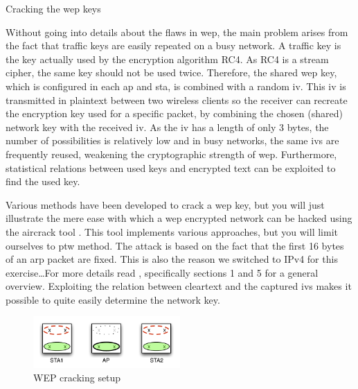 \begin{exercise}{Cracking the \ac{wep} keys}	

	Without going into details about the flaws in  \ac{wep}, the main problem arises from the fact that traffic keys are easily repeated on a busy network. A traffic key is the key actually used by the encryption algorithm RC4.  As RC4 is a stream cipher, the same key should not be used twice. Therefore, the shared \ac{wep} key, which is configured in each \ac{ap} and \ac{sta}, is combined with a random \ac{iv}. This \ac{iv} is transmitted in plaintext between two wireless clients so the receiver can recreate the encryption key used for a specific packet, by combining the chosen (shared) network key with the received \ac{iv}. As the \ac{iv} has a length of only 3 bytes, the number of possibilities is relatively low and in busy networks, the same \acp{iv} are frequently reused, weakening the cryptographic strength of \ac{wep}. Furthermore, statistical relations between used keys and encrypted text can be exploited to find the used key.
	
	Various methods have been developed to crack a \ac{wep} key, but you will just illustrate the mere ease with which a \ac{wep} encrypted network can be hacked using the aircrack tool \cite{aircrackNG}. This tool implements various approaches, but you will limit ourselves to \ac{ptw} method. The attack is based on the fact that the first 16 bytes of an \ac{arp} packet are fixed. This is also the reason we switched to IPv4 for this exercise\ldots For more details read \cite{cryptoeprint:2007:120}, specifically sections 1 and 5 for a general overview. Exploiting the relation between cleartext and the captured \acp{iv} makes it possible to quite easily determine the network key.
	
	\begin{figure}[h!]
		\begin{center}
			\includegraphics[width=0.5\textwidth]{images/wepcrack2.pdf}
			\caption{WEP cracking setup} 
			\label{fig:wepcrack2} 
		\end{center}
	\end{figure}
	

\end{exercise}
